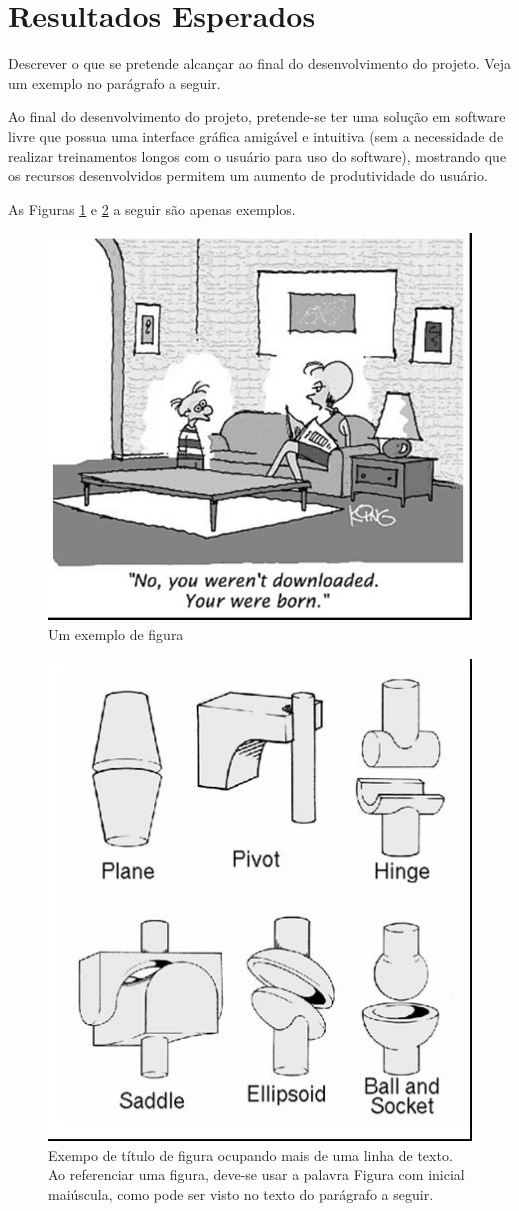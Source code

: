 \documentclass[12pt]{article}
\begin{document}
\section{Resultados Esperados} \label{sec:resultados}
Descrever o que se pretende alcançar ao final do desenvolvimento do projeto. Veja um exemplo no parágrafo a seguir.

	Ao final do desenvolvimento do projeto, pretende-se ter uma solução em software livre que possua uma interface gráfica amigável e intuitiva (sem a necessidade de realizar treinamentos longos com o usuário para uso do software), mostrando que os recursos desenvolvidos permitem um aumento de produtividade do usuário.
	
As Figuras \ref{fig:figura1} e \ref{fig:figura2} a seguir são apenas exemplos.

\begin{figure}[ht]
\centering
\includegraphics[width=.5\textwidth]{fig1.jpg}
\caption{Um exemplo de figura}
\label{fig:figura1}
\end{figure}

\begin{figure}[ht]
\centering
\includegraphics[width=.3\textwidth]{fig2.jpg}
\caption{Exempo de título de figura ocupando mais de uma linha de texto. Ao referenciar uma figura, deve-se usar a palavra Figura com inicial maiúscula, como pode ser visto no texto do parágrafo a seguir.}
\label{fig:figura2}
\end{figure}
\end{document}
